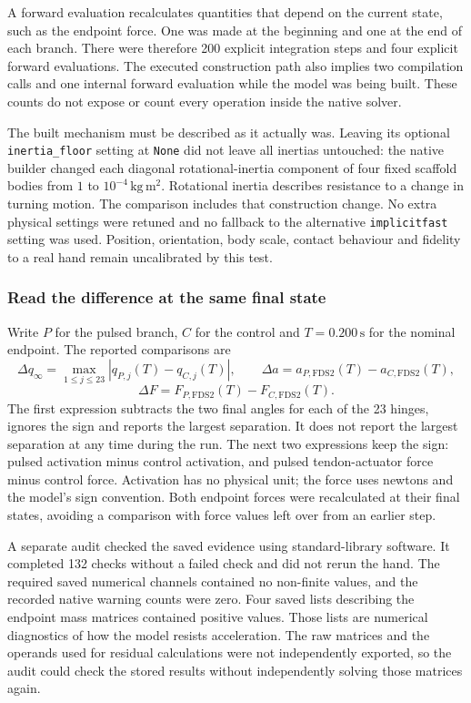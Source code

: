 A forward evaluation recalculates quantities that depend on the current state, such as the endpoint force. One was made at the beginning and one at the end of each branch. There were therefore 200 explicit integration steps and four explicit forward evaluations. The executed construction path also implies two compilation calls and one internal forward evaluation while the model was being built. These counts do not expose or count every operation inside the native solver.

The built mechanism must be described as it actually was. Leaving its optional \texttt{inertia\_floor} setting at \texttt{None} did not leave all inertias untouched: the native builder changed each diagonal rotational-inertia component of four fixed scaffold bodies from $1$ to $10^{-4}\,\mathrm{kg\,m^2}$. Rotational inertia describes resistance to a change in turning motion. The comparison includes that construction change. No extra physical settings were retuned and no fallback to the alternative \texttt{implicitfast} setting was used. Position, orientation, body scale, contact behaviour and fidelity to a real hand remain uncalibrated by this test.

\subsubsection{Read the difference at the same final state}

Write $P$ for the pulsed branch, $C$ for the control and $T=0.200\,\mathrm{s}$ for the nominal endpoint. The reported comparisons are
\[
\Delta q_{\infty}=\max_{1\leq j\leq23}|q_{P,j}(T)-q_{C,j}(T)|,
\qquad
\Delta a=a_{P,\mathrm{FDS2}}(T)-a_{C,\mathrm{FDS2}}(T),
\]
\[
\Delta F=F_{P,\mathrm{FDS2}}(T)-F_{C,\mathrm{FDS2}}(T).
\]
The first expression subtracts the two final angles for each of the 23 hinges, ignores the sign and reports the largest separation. It does not report the largest separation at any time during the run. The next two expressions keep the sign: pulsed activation minus control activation, and pulsed tendon-actuator force minus control force. Activation has no physical unit; the force uses newtons and the model's sign convention. Both endpoint forces were recalculated at their final states, avoiding a comparison with force values left over from an earlier step.



A separate audit checked the saved evidence using standard-library software. It completed 132 checks without a failed check and did not rerun the hand. The required saved numerical channels contained no non-finite values, and the recorded native warning counts were zero. Four saved lists describing the endpoint mass matrices contained positive values. Those lists are numerical diagnostics of how the model resists acceleration. The raw matrices and the operands used for residual calculations were not independently exported, so the audit could check the stored results without independently solving those matrices again.

